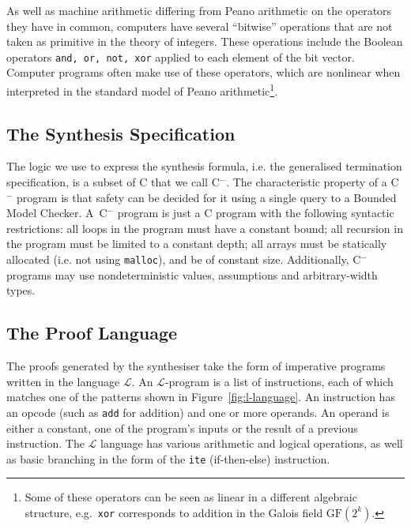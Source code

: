 \documentclass[preprint]{sigplanconf}
\theoremstyle{definition}
\newcommand{\newC}{C$^-$\xspace}
\begin{document}

As well as machine arithmetic differing from Peano arithmetic on the
operators they have in common, computers have several ``bitwise'' operations
that are not taken as primitive in the theory of integers.  These operations
include the Boolean operators \texttt{and, or, not, xor} applied to each
element of the bit vector.  Computer programs often make use of these
operators, which are nonlinear when interpreted in the standard model of
Peano arithmetic\footnote{Some of these operators can be seen as
linear in a different algebraic structure, e.g.~\texttt{xor} corresponds to
addition in the Galois field $\mathrm{GF}(2^k)$.}.

\subsection{The Synthesis Specification}

The logic we use to express the synthesis formula, i.e.
the generalised termination specification, is a subset of C that we call
\newC.  The characteristic property of a \newC program is that safety can be
decided for it using a single query to a Bounded Model Checker.  A~\newC
program is just a C program with the following syntactic restrictions:
 all loops in the program must have a constant bound;
 all recursion in the program must be limited to a constant depth;
 all arrays must be statically allocated (i.e. not using \texttt{malloc}),
 and be of constant size.
Additionally, \newC programs may use nondeterministic values, assumptions
and arbitrary-width types.

\subsection{The Proof Language}
The proofs generated by the synthesiser take the form of imperative programs
written in the language $\mathcal{L}$.  An
$\mathcal{L}$-program is a list of instructions, each of which matches one of the
patterns shown in Figure~\ref{fig:l-language}.  An instruction has an opcode
(such as \verb|add| for addition) and one or more operands.  An operand is either
a constant, one of the program's inputs or the result of a previous instruction.
The $\mathcal{L}$ language has various arithmetic and logical operations,
as well as basic branching in the form of the \verb|ite| (if-then-else) instruction.
\end{document}
